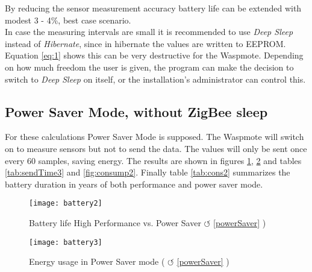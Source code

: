 By reducing the sensor measurement accuracy battery life can be extended with modest 3 - 4\%, best case scenario.\\
In case the measuring intervals are small it is recommended to use \textit{Deep Sleep} instead of \textit{Hibernate}, since in hibernate the values are written to EEPROM. Equation \ref{eq:1} shows this can be very destructive for the Waspmote. Depending on how much freedom the user is given, the program can make the decision to switch to \textit{Deep Sleep} on itself, or the installation's administrator can control this.
\clearpage
\subsection{Power Saver Mode, without ZigBee sleep}
For these calculations Power Saver Mode is supposed. The Waspmote will switch on to measure sensors but not to send the data. The values will only be sent once every 60 samples, saving energy. The results are shown in figures \ref{fig:batCalcPS}, \ref{fig:batCalcPS1} and tables \ref{tab:sendTime3} and \ref{fig:consump2}. Finally table \ref{tab:cons2} summarizes the battery duration in years of both performance and power saver mode.\\
\begin{figure}[!ht]
\centering
\texttt{[image: battery2]}
\caption{Battery life High Performance vs. Power Saver $\circlearrowleft$ \ref{powerSaver} )}
\label{fig:batCalcPS}
\end{figure}
\begin{figure}[htbp]
\centering
\texttt{[image: battery3]}
\caption{Energy usage in Power Saver mode ( $\circlearrowleft$ \ref{powerSaver} )}
\label{fig:batCalcPS1}
\end{figure}
